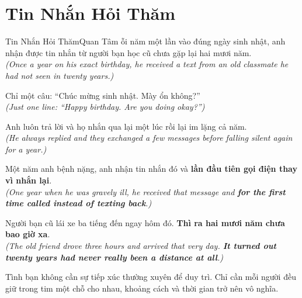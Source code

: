 \section{Tin Nhắn Hỏi Thăm}
\begin{truyen}{Tin Nhắn Hỏi Thăm}{Quan Tâm}
ỗi năm một lần vào đúng ngày sinh nhật, anh nhận được tin nhắn từ người bạn học cũ chưa gặp lại hai mươi năm.\\
\textit{(Once a year on his exact birthday, he received a text from an old classmate he had not seen in twenty years.)}

Chỉ một câu: ``Chúc mừng sinh nhật. Mày ổn không?''\\
\textit{(Just one line: ``Happy birthday. Are you doing okay?'')}

Anh luôn trả lời và họ nhắn qua lại một lúc rồi lại im lặng cả năm.\\
\textit{(He always replied and they exchanged a few messages before falling silent again for a year.)}

Một năm anh bệnh nặng, anh nhận tin nhắn đó và \textbf{lần đầu tiên gọi điện thay vì nhắn lại}.\\
\textit{(One year when he was gravely ill, he received that message and \textbf{for the first time called instead of texting back}.)}

Người bạn cũ lái xe ba tiếng đến ngay hôm đó. \textbf{Thì ra hai mươi năm chưa bao giờ xa}.\\
\textit{(The old friend drove three hours and arrived that very day. \textbf{It turned out twenty years had never really been a distance at all}.)}
\end{truyen}
\begin{baihoc}
  Tình bạn không cần sự tiếp xúc thường xuyên để duy trì. Chỉ cần mỗi người đều giữ trong tim một chỗ cho nhau, khoảng cách và thời gian trở nên vô nghĩa.
\end{baihoc}
